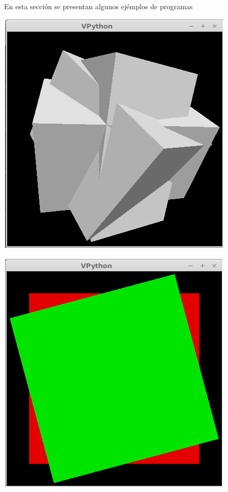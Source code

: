 En esta secci\'on se presentan algunos ej\'emplos de programas



\centerline{\includegraphics[scale=0.40]{../imagenes/eg04.jpg}}





\centerline{\includegraphics[scale=0.40]{../imagenes/eg11.jpg}}

